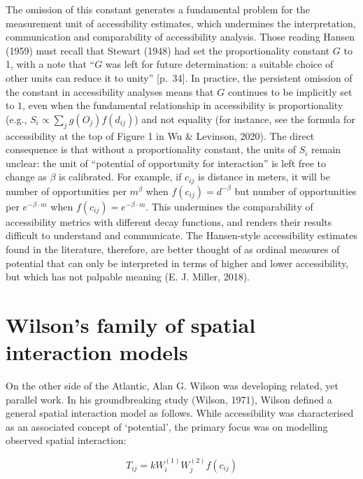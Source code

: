\documentclass[
11pt, %
oneside, %
english, %
singlespacing, %
]{macthesis} %
\begin{document}
The omission of this constant generates a fundamental problem for the measurement unit of accessibility estimates, which undermines the interpretation, communication and comparability of accessibility analysis. Those reading Hansen (1959) must recall that Stewart (1948) had set the proportionality constant \(G\) to 1, with a note that ``\(G\) was left for future determination: a suitable choice of other units can reduce it to unity'' {[}p.~34{]}. In practice, the persistent omission of the constant in accessibility analyses means that \(G\) continues to be implicitly set to \(1\), even when the fundamental relationship in accessibility is proportionality (e.g., \(S_{i} \propto \sum_j g(O_j)f(d_{ij})\)) and not equality (for instance, see the formula for accessibility at the top of Figure 1 in Wu \& Levinson, 2020). The direct consequence is that without a proportionality constant, the units of \(S_i\) remain unclear: the unit of ``potential of opportunity for interaction'' is left free to change as \(\beta\) is calibrated. For example, if \(c_{ij}\) is distance in meters, it will be number of opportunities per \(m^{\beta}\) when \(f(c_{ij}) = d^{-\beta}\) but number of opportunities per \(e^{-\beta\cdot m}\) when \(f(c_{ij}) = e^{-\beta\cdot m}\). This undermines the comparability of accessibility metrics with different decay functions, and renders their results difficult to understand and communicate. The Hansen-style accessibility estimates found in the literature, therefore, are better thought of as ordinal measures of potential that can only be interpreted in terms of higher and lower accessibility, but which has not palpable meaning (E. J. Miller, 2018).

\section{Wilson's family of spatial interaction models}\label{wilsons-family-of-spatial-interaction-models}

On the other side of the Atlantic, Alan G. Wilson was developing related, yet parallel work. In his groundbreaking study (Wilson, 1971), Wilson defined a general spatial interaction model as follows. While accessibility was characterised as an associated concept of `potential', the primary focus was on modelling observed spatial interaction:

\begin{equation}
\label{eq:phys-gravity-model}
T_{ij} = k W_i^{(1)} W_j^{(2)} f(c_{ij})
\end{equation} 
\end{document}
